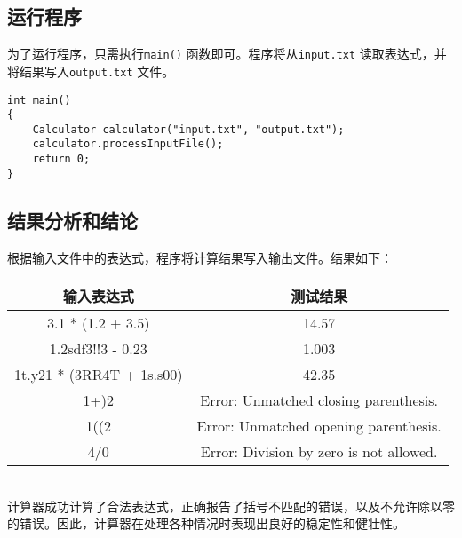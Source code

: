 \documentclass[twoside,a4paper,10pt]{article}
\begin{document}
\subsection{运行程序}
为了运行程序，只需执行\texttt{main()} 函数即可。程序将从\texttt{input.txt} 读取表达式，并将结果写入\texttt{output.txt} 文件。

\begin{lstlisting}
int main() 
{
    Calculator calculator("input.txt", "output.txt");
    calculator.processInputFile();
    return 0;
}
\end{lstlisting}

\subsection{结果分析和结论}
根据输入文件中的表达式，程序将计算结果写入输出文件。结果如下：

\begin{tabular}{|c|c|}
\hline
\textbf{输入表达式} & \textbf{测试结果} \\
\hline
3.1 * (1.2 + 3.5) & 14.57 \\
\hline
1.2sdf3!!3 - 0.23 & 1.003 \\
\hline
1t.y21 * (3RR4T + 1s.s00) & 42.35 \\
\hline
1+)2 & Error: Unmatched closing parenthesis. \\
\hline
1((2 & Error: Unmatched opening parenthesis. \\
\hline
4/0 & Error: Division by zero is not allowed. \\
\hline
\end{tabular}
\\
计算器成功计算了合法表达式，正确报告了括号不匹配的错误，以及不允许除以零的错误。因此，计算器在处理各种情况时表现出良好的稳定性和健壮性。
\end{document}
